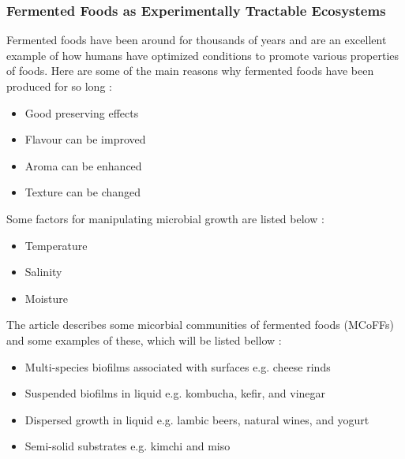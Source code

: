\subsubsection*{Fermented Foods as Experimentally Tractable Ecosystems}
Fermented foods have been around for thousands of years and are an excellent example of how humans have optimized conditions to promote various properties of foods. Here are some of the main reasons why fermented foods have been produced for so long \cite*{L1-FermentedFoods}:
\begin{highlight}
    \begin{itemize}
    \item Good preserving effects
    \item Flavour can be improved
    \item Aroma can be enhanced
    \item Texture can be changed
    \end{itemize}
\end{highlight}

Some factors for manipulating microbial growth are listed below \cite*{L1-FermentedFoods}:
\begin{highlight}
    \begin{itemize}
    \item Temperature
    \item Salinity
    \item Moisture
    \end{itemize}
\end{highlight}

\vspace*{1em}
The article describes some micorbial communities of fermented foods (MCoFFs) and some examples of these, which will be listed bellow \cite*{L1-FermentedFoods}:
\begin{highlight}
    \begin{itemize}
    \item Multi-species biofilms associated with surfaces 
    \subitem e.g. cheese rinds
    \vspace*{0.5em}

    \item Suspended biofilms in liquid
    \subitem e.g. kombucha, kefir, and vinegar
    \vspace*{0.5em}

    \item Dispersed growth in liquid
    \subitem e.g. lambic beers, natural wines, and yogurt
    \vspace*{0.5em}

    \item Semi-solid substrates
    \subitem e.g. kimchi and miso
    \end{itemize}
\end{highlight}

